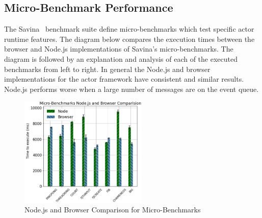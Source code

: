 \documentclass[lettersize,journal]{IEEEtran}
\begin{document}
\subsection{Micro-Benchmark Performance}
The Savina~\cite{savina} benchmark suite define micro-benchmarks which test specific actor runtime features. The diagram below compares the execution times between the browser and Node.js implementations of Savina's micro-benchmarks. The diagram is followed by an explanation and analysis of each of the executed benchmarks from left to right. In general the Node.js and browser implementations for the actor framework have consistent and similar results. Node.js performs worse when a large number of messages are on the event queue.
\begin{figure}[H]
    \begin{centering}
        \includegraphics[width=230px]{resources/micro.png}
        \caption{Node.js and Browser Comparison for Micro-Benchmarks}
    \end{centering}
\end{figure}
\end{document}

